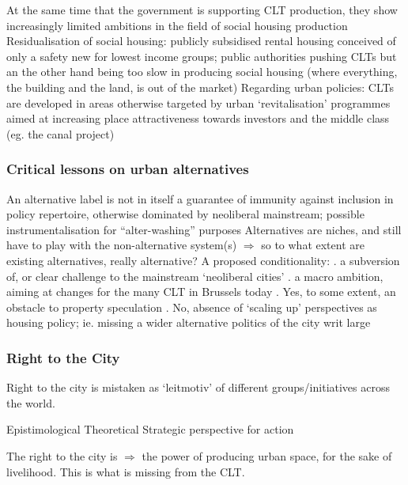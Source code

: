 \documentclass{article}
\begin{document}
\begin{outline}
	\1 At the same time that the government is supporting CLT production, they show increasingly limited ambitions in the field of social housing production
	\1 Residualisation of social housing: publicly subsidised rental housing conceived of only a safety new for lowest income groups; public authorities pushing CLTs but an the other hand being too slow in producing social housing (where everything, the building and the land, is out of the market)
	\1 Regarding urban policies:
		\2 CLTs are developed in areas otherwise targeted by urban `revitalisation' programmes aimed at increasing place attractiveness towards investors and the middle class (eg. the canal project)
\end{outline}

\subsubsection{Critical lessons on urban alternatives}

\begin{outline}
	\1 An alternative label is not in itself a guarantee of immunity against inclusion in policy repertoire, otherwise dominated by neoliberal mainstream; possible instrumentalisation for ``alter-washing'' purposes
	\1 Alternatives are niches, and still have to play with the non-alternative system(s)
	\1 $\Rightarrow$ so to what extent are existing alternatives, really alternative? A proposed conditionality:
		. a subversion of, or clear challenge to the mainstream `neoliberal cities'
		. a macro ambition, aiming at changes for the many
	\1 CLT in Brussels today
		. Yes, to some extent, an obstacle to property speculation
		. No, absence of `scaling up' perspectives as housing policy; ie. missing a wider alternative politics of the city writ large
\end{outline}

\subsubsection{Right to the City}

Right to the city is mistaken as `leitmotiv' of different groups/initiatives across the world.

\begin{outline}
	\1 Epistimological
	\1 Theoretical
	\1 Strategic perspective for action
\end{outline}

The right to the city is $\Rightarrow$ the power of producing urban space, for the sake of livelihood. This is what is missing from the CLT. 
\end{document}
